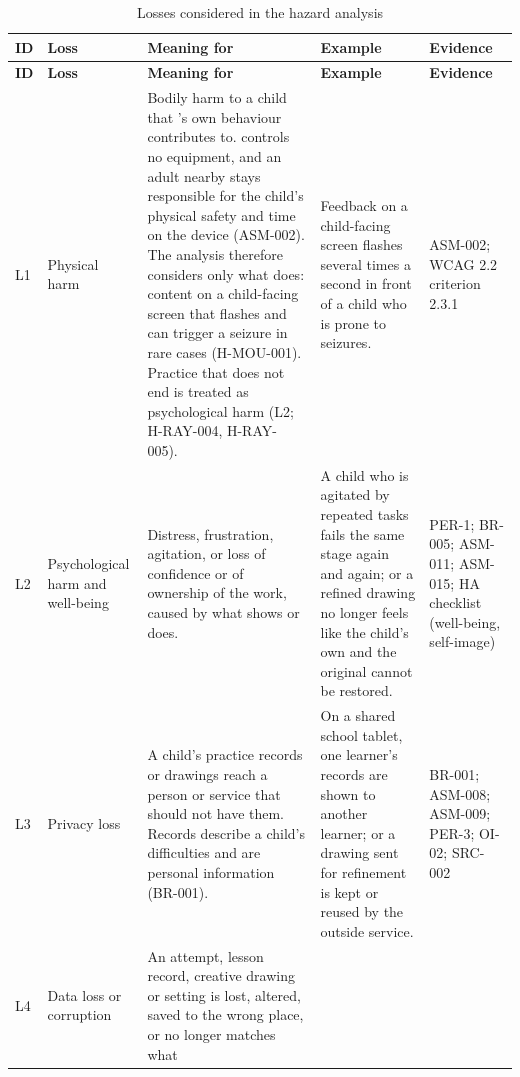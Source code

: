 \documentclass{article}
\begin{document}
{\footnotesize
\setlength{\tabcolsep}{4pt}
\begin{longtable}{@{}
  >{\raggedright\arraybackslash}p{}
  >{\raggedright\arraybackslash}p{}
  >{\raggedright\arraybackslash}p{}
  >{\raggedright\arraybackslash}p{}
  >{\raggedright\arraybackslash}p{}@{}} \caption{Losses considered
  in the hazard analysis}\label{tab:losses}\\
\toprule
\textbf{ID} & \textbf{Loss} & \textbf{Meaning for \progname{}} &
\textbf{Example} & \textbf{Evidence} \\
\midrule
\endfirsthead
\toprule
\textbf{ID} & \textbf{Loss} & \textbf{Meaning for \progname{}} &
\textbf{Example} & \textbf{Evidence} \\
\midrule
\endhead
\bottomrule
\endlastfoot
L1 & Physical harm & Bodily harm to a child that \progname{}'s own behaviour
contributes to. \progname{} controls no equipment, and an adult nearby stays
responsible for the child's physical safety and time on the device (ASM-002).
The analysis therefore considers only what \progname{} does: content on a
child-facing screen that flashes and can trigger a seizure in rare cases
(H-MOU-001). Practice that does not end is treated as psychological harm (L2;
H-RAY-004, H-RAY-005). & Feedback on a child-facing screen flashes several
times a second in front of a child who is prone to seizures. & ASM-002; WCAG
2.2 criterion 2.3.1 \citep{wcag22} \\
\addlinespace
L2 & Psycho\-logical harm and well-being & Distress, frustration, agitation, or
loss of confidence or of ownership of the work, caused by what \progname{} shows
or does. & A child who is agitated by repeated tasks fails the same stage again
and again; or a refined drawing no longer feels like the child's own and the
original cannot be restored. & PER-1; BR-005; ASM-011; ASM-015; HA checklist
(well-being, self-image) \\
\addlinespace
L3 & Privacy loss & A child's practice records or drawings reach a person or
service that should not have them. Records describe a child's difficulties and
are personal information (BR-001). & On a shared school tablet, one learner's
records are shown to another learner; or a drawing sent for refinement is kept
or reused by the outside service. & BR-001; ASM-008; ASM-009; PER-3; OI-02;
SRC-002 \\
\addlinespace
L4 & Data loss or corruption & An attempt, lesson record, creative drawing or
setting is lost, altered, saved to the wrong place, or no longer matches what

\end{longtable}}
\end{document}
